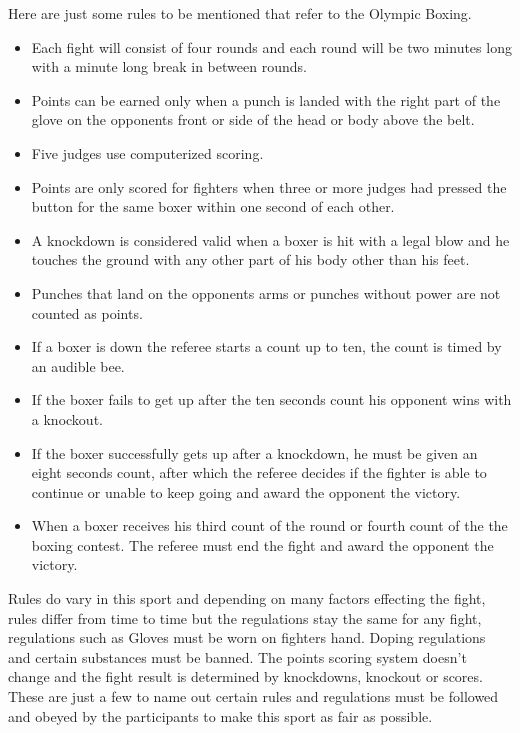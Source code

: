 \documentclass[a4paper,12pt]{report}
\begin{document}
Here are just some rules to be mentioned that refer to the Olympic Boxing.
\begin{itemize}
    \item Each fight will consist of four rounds and each round will be two minutes long with a minute long break in between rounds.
    \item Points can be earned only when a punch is landed with the right part of the glove on the opponents front or side of the head or body above the belt.
    \item Five judges use computerized scoring.
    \item Points are only scored for fighters when three or more judges had pressed the button for the same boxer within one second of each other.
    \item A knockdown is considered valid when a boxer is hit with a legal blow and he touches the ground with any other part of his body other than his feet.
    \item Punches  that land on the opponents arms or punches without power are not counted as points.
    \item If a boxer is down the referee starts a count up to ten, the count is timed by an audible bee.
    \item If the boxer fails to get up after the ten seconds count his opponent wins with a knockout.
    \item If the boxer successfully gets up after a knockdown, he must be given an eight seconds count, after which the referee decides if the fighter is able to continue or unable to keep going and award the opponent the victory.
    \item When a boxer receives his third count of the round or fourth count of the the boxing contest. The referee must end the fight and award the opponent the victory.
\end{itemize}
\cite{lewandowski2012olympic}

Rules do vary in this sport and depending on many factors effecting the fight, rules differ from time to time but the regulations stay the same for any fight, regulations such as
Gloves must be worn on fighters hand.
Doping regulations and certain substances must be banned.
The points scoring system doesn't change and the fight result is determined by knockdowns, knockout or scores.
These are just a few to name out certain rules and regulations must be followed and obeyed by the participants to make this sport as fair as possible. 
\end{document}
